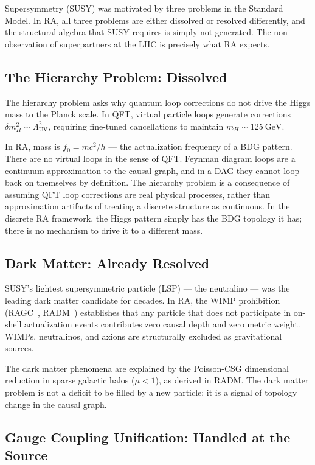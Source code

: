 \documentclass[11pt,a4paper]{article}
\begin{document}
Supersymmetry (SUSY) was motivated by three problems in the Standard Model.
In RA, all three problems are either dissolved or resolved differently, and
the structural algebra that SUSY requires is simply not generated. The
non-observation of superpartners at the LHC is precisely what RA expects.

\subsection{The Hierarchy Problem: Dissolved}

The hierarchy problem asks why quantum loop corrections do not drive the Higgs
mass to the Planck scale. In QFT, virtual particle loops generate corrections
$\delta m_H^2 \sim \Lambda_{\mathrm{UV}}^2$, requiring fine-tuned cancellations
to maintain $m_H \sim 125~\text{GeV}$.

In RA, mass is $f_0 = mc^2/h$ --- the actualization frequency of a BDG pattern.
There are no virtual loops in the sense of QFT. Feynman diagram loops are a
continuum approximation to the causal graph, and in a DAG they cannot loop
back on themselves by definition. The hierarchy problem is a consequence of
assuming QFT loop corrections are real physical processes, rather than
approximation artifacts of treating a discrete structure as continuous.
In the discrete RA framework, the Higgs pattern simply has the BDG topology
it has; there is no mechanism to drive it to a different mass.

\subsection{Dark Matter: Already Resolved}

SUSY's lightest supersymmetric particle (LSP) --- the neutralino --- was the
leading dark matter candidate for decades. In RA, the WIMP prohibition
(RAGC~\citep{Sandeman2026RAGC}, RADM~\citep{Sandeman2026RADM}) establishes
that any particle that does not participate in on-shell actualization events
contributes zero causal depth and zero metric weight. WIMPs, neutralinos, and
axions are structurally excluded as gravitational sources.

The dark matter phenomena are explained by the Poisson-CSG dimensional
reduction in sparse galactic halos ($\mu < 1$), as derived in RADM.
The dark matter problem is not a deficit to be filled by a new particle;
it is a signal of topology change in the causal graph.

\subsection{Gauge Coupling Unification: Handled at the Source}
\end{document}
